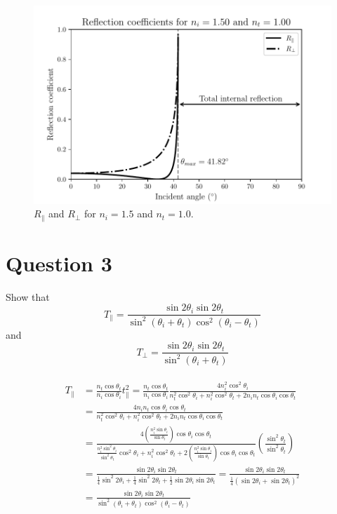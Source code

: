 \documentclass[a4paper]{article}
\begin{document}
\begin{figure}[H]
    \centering
    \includegraphics[width = \textwidth]{reflection_coefficients.pdf}
    \caption{$R_\parallel$ and $R_\perp$ for $n_i = 1.5$ and $n_t = 1.0$.}
\end{figure}

\section*{Question 3}
Show that
\[
    T_\parallel = \frac{\sin 2 \theta_i \sin 2 \theta_t}{\sin^2 (\theta_i + \theta_t) \cos^2 (\theta_i - \theta_t)}
\]
and
\[
    T_\perp = \frac{\sin 2 \theta_i \sin 2 \theta_t}{\sin^2(\theta_i + \theta_t)}
\] \\

\begin{align}
    T_\parallel &= \frac{n_t \cos \theta_t}{n_i \cos \theta_i} t_\parallel^2 = \frac{n_t \cos \theta_t}{n_i \cos \theta_i} \frac{4 n_i^2 \cos^2 \theta_i}{n_t^2 \cos^2 \theta_i + n_i^2\cos^2 \theta_t + 2 n_i n_t \cos \theta_i \cos \theta_t}\\
    &=\frac{4 n_i n_t \cos \theta_i \cos \theta_t}{n_t^2 \cos^2 \theta_i + n_i^2\cos^2 \theta_t + 2 n_i n_t \cos \theta_i \cos \theta_t}\\
    &=\frac{4\left(\frac{n_i^2 \sin \theta_i}{\sin \theta_t}\right)\cos \theta_i \cos \theta_t}{\frac{n_i^2 \sin^2 \theta_i}{\sin^2 \theta_t} \cos^2 \theta_i + n_i^2 \cos^2 \theta_t + 2\left(\frac{n_i^2 \sin \theta_i}{\sin \theta_t}\right)\cos \theta_i \cos \theta_t} \left( \frac{\sin^2 \theta_t}{\sin^2 \theta_t} \right)\\
    &=\frac{\sin 2 \theta_i \sin 2 \theta_t}{\frac{1}{4}\sin^2 2 \theta_i + \frac{1}{4}\sin^2 2 \theta_t + \frac{1}{2}\sin 2 \theta_i \sin 2 \theta_t} = \frac{\sin 2 \theta_i \sin 2 \theta_t}{\frac{1}{4}\left(\sin 2 \theta_i  + \sin 2 \theta_t\right)^2}\\
    &=  \frac{\sin 2 \theta_i \sin 2 \theta_t}{\sin^2 (\theta_i + \theta_t) \cos^2 (\theta_i - \theta_t)}
\end{align}
\end{document}
